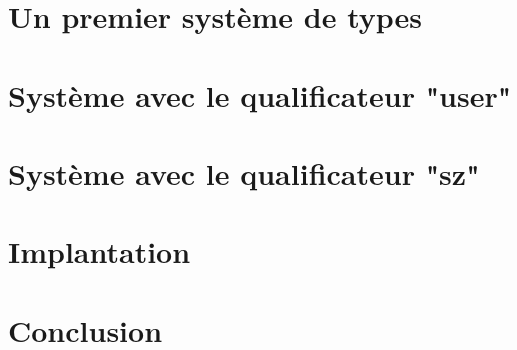\documentclass[a4paper,11pt]{memoir}
\begin{document}
\chapter{Un premier système de types}



\chapter{Système avec le qualificateur "user"}



\chapter{Système avec le qualificateur "sz"}



\chapter{Implantation}

\label{cha:implem}


\chapter{Conclusion}



\backmatter


\listoffigures




\end{document}
